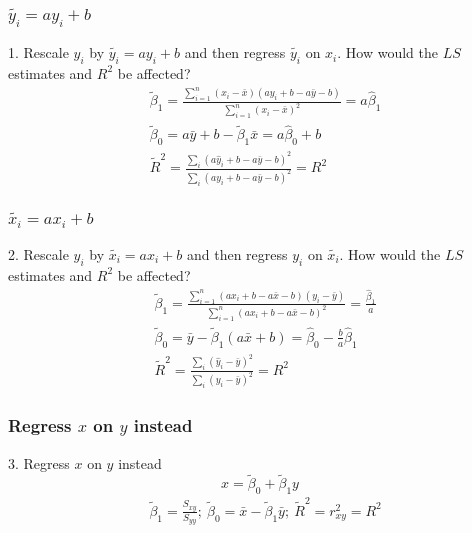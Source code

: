 \documentclass[11pt,a4paper]{article}
\begin{document}
\subsubsection{$\tilde{y_i}=ay_i+b$}
1. Rescale $y_i$ by $\tilde{y_i}=ay_i+b$ and then regress $\tilde{y_i}$ on $x_i$. How would the $LS$ estimates and $R^2$ be affected?
\begin{equation}
    \begin{aligned}
        &\tilde{\beta}_1=\frac{\sum_{i=1}^{n}\left(x_{i}-\bar{x}\right)\left(ay_{i}+b-a\bar{y}-b\right)}{\sum_{i=1}^{n}\left(x_{i}-\bar{x}\right)^{2}}=a \hat{\beta}_1\\
        &\tilde{\beta}_0=a\bar{y}+b-\tilde{\beta}_{1}\bar{x}=a \hat{\beta}_0+b\\
        &\tilde{R}^2=\frac{\sum_{i}\left(a\hat{y}_{i}+b-a\bar{y}-b\right)^{2}}{\sum_{i}\left(ay_{i}+b-a\bar{y}-b\right)^{2}}=R^2
    \end{aligned}
    \nonumber
\end{equation}
\subsubsection{$\tilde{x_i}=ax_i+b$}
2. Rescale $y_i$ by $\tilde{x_i}=ax_i+b$ and then regress $y_i$ on $\tilde{x_i}$. How would the $LS$ estimates and $R^2$ be affected?
\begin{equation}
    \begin{aligned}
        &\tilde{\beta}_1=\frac{\sum_{i=1}^{n}\left(ax_{i}+b-a\bar{x}-b\right)\left(y_{i}-\bar{y}\right)}{\sum_{i=1}^{n}\left(ax_{i}+b-a\bar{x}-b\right)^{2}}=\frac{\hat{\beta}_1}{a}\\
        &\tilde{\beta}_0=\bar{y}-\tilde{\beta}_{1}(a\bar{x}+b)=\hat{\beta}_0-\frac{b}{a}\hat{\beta}_{1}\\
        &\tilde{R}^2=\frac{\sum_{i}\left(\hat{y}_{i}-\bar{y}\right)^{2}}{\sum_{i}\left(y_{i}-\bar{y}\right)^{2}}=R^2
    \end{aligned}
    \nonumber
\end{equation}
\subsubsection{Regress $x$ on $y$ instead}
3. Regress $x$ on $y$ instead
$$x=\tilde{\beta}_0+\tilde{\beta}_1y$$
\begin{equation}
    \begin{aligned}
        &\tilde{\beta}_1=\frac{S_{x y}}{S_{yy}};\ \tilde{\beta}_0=\bar{x}-\tilde{\beta}_1\bar{y};\ \tilde{R}^2=r_{xy}^2=R^2
    \end{aligned}
    \nonumber
\end{equation}
\end{document}
